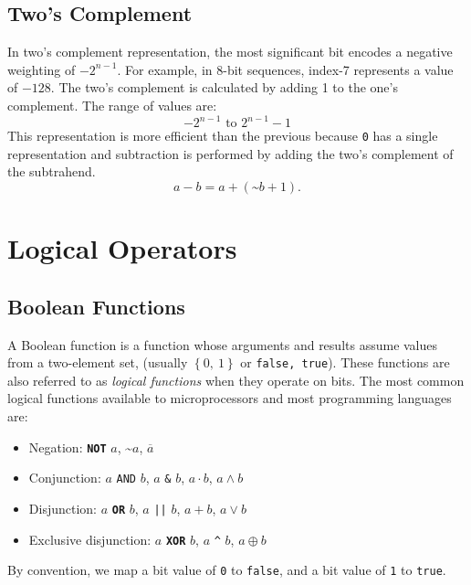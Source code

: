 \documentclass{report}
\newcommand{\keywordinline}[1]{\textcolor[rgb]{0.00,0.50,0.00}{\textbf{\texttt{#1}}}}
\begin{document}
\subsection{Two's Complement}
In two's complement representation, the most significant bit encodes a negative weighting of
\(-2^{n - 1}\). For example, in 8-bit sequences, index-7 represents a value of \(-128\).
The two's complement is calculated by adding 1 to the one's complement.
The range of values are:
\begin{equation*}
    -2^{n - 1} \text{ to } 2^{n - 1} - 1
\end{equation*}
This representation is more efficient than the previous because \texttt{0} has a single representation
and subtraction is performed by adding the two's complement of the subtrahend.
\begin{equation*}
    a - b = a + \left( \text{\textasciitilde} b + 1 \right).
\end{equation*}
\section{Logical Operators}
\subsection{Boolean Functions}
A Boolean function is a function whose arguments and results assume values
from a two-element set, (usually \(\left\{ 0,\: 1 \right\}\) or \texttt{{false, true}}).
These functions are also referred to as \textit{logical functions} when they operate on bits.
The most common logical functions available to microprocessors and most programming languages are:
\begin{itemize}
    \item Negation: \keywordinline{NOT} \(a\), \textasciitilde\(a\), \(\overline{a}\)
    \item Conjunction: \(a\) \texttt{AND} \(b\), \(a\) \texttt{&} \(b\), \(a \cdot b\), \(a \land b\)
    \item Disjunction: \(a\) \keywordinline{OR} \(b\), \(a\) \texttt{|\vert|} \(b\), \(a + b\), \(a \lor b\)
    \item Exclusive disjunction: \(a\) \keywordinline{XOR} \(b\), \(a\) \texttt{^} \(b\), \(a \oplus b\)
\end{itemize}
By convention, we map a bit value of \texttt{0} to \texttt{false}, and a bit value of \texttt{1} to \texttt{true}.
\end{document}
